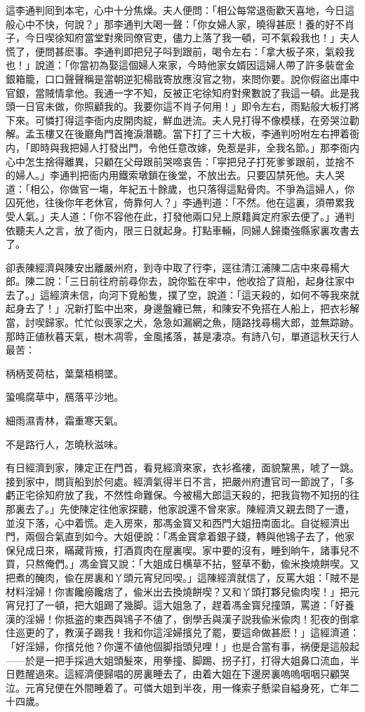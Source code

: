 這李通判囘到本宅，心中十分焦燥。夫人便問：「相公每常退衙歡天喜地，今日這般心中不快，何說？」那李通判大喝一聲：「你女婦人家，曉得甚麽！養的好不肖子，今日喫徐知府當堂對衆同僚官吏，儘力上落了我一頓，可不氣殺我也！」夫人慌了，便問甚麽事。李通判即把兒子呌到跟前，喝令左右：「拿大板子來，氣殺我也！」說道：「你當初為娶這個婦人來家，今時他家女婿因這婦人帶了許多裝奩金銀箱籠，口口聲聲稱是當朝逆犯楊戩寄放應沒官之物，來問你要。說你假盜出庫中官銀，當賊情拿他。我通一字不知，反被正宅徐知府對衆數說了我這一頓。此是我頭一日官未做，你照顧我的。我要你這不肖子何用！」即令左右，雨點般大板打將下來。可憐打得這李衙内皮開肉綻，鮮血迸流。夫人見打得不像模樣，在旁哭泣勸解。孟玉樓又在後廳角門首掩淚潛聽。當下打了三十大板，李通判吩咐左右押着衙内，「即時與我把婦人打發出門，令他任意改嫁，免惹是非，全我名節。」那李衙内心中怎生捨得離異，只顧在父母跟前哭啼哀告：「寜把兒子打死爹爹跟前，並捨不的婦人。」李通判把衙内用鐵索墩鎖在後堂，不放出去。只要囚禁死他。夫人哭道：「相公，你做官一塲，年紀五十餘歲，也只落得這點骨肉。不爭為這婦人，你囚死他，往後你年老休官，倚靠何人？」李通判道：「不然。他在這裏，須帶累我受人氣。」夫人道：「你不容他在此，打發他兩口兒上原籍眞定府家去便了。」通判依聽夫人之言，放了衙内，限三日就起身。打點車輛，同婦人歸棗強縣家裏攻書去了。

卻表陳經濟與陳安出離嚴州府，到寺中取了行李，逕往清江浦陳二店中來尋楊大郎。陳二說：「三日前往府前尋你去，說你監在牢中，他收拾了貨船，起身往家中去了。」這經濟未信，向河下覓船隻，撲了空，說道：「這天殺的，如何不等我來就起身去了！」况新打監中出來，身邊盤纏已無，和陳安不免搭在人船上，把衣衫解當，討喫歸家。忙忙似喪家之犬，急急如漏網之魚，隨路找尋楊大郎，並無踪跡。那時正値秋暮天氣，樹木凋零，金風搖落，甚是凄凉。有詩八句，單道這秋天行人最苦：

\begin{myquote}
柄柄芰荷枯，葉葉梧桐墜。

蛩鳴腐草中，鴈落平沙地。

細雨濕青林，霜重寒天氣。

不是路行人，怎曉秋滋味。
\end{myquote}

有日經濟到家，陳定正在門首，看見經濟來家，衣衫襤褸，面貌黧黑，唬了一跳。接到家中，問貨船到於何處。經濟氣得半日不言，把嚴州府遭官司一節說了，「多虧正宅徐知府放了我，不然性命難保。今被楊大郎這天殺的，把我貨物不知拐的往那裏去了。」先使陳定往他家探聽，他家說還不曾來家。陳經濟又親去問了一遭，並沒下落，心中着慌。走入房來，那馮金寳又和西門大姐扭南面北。自従經濟出門，兩個合氣直到如今。大姐便說：「馮金寳拿着銀子錢，轉與他鴇子去了，他家保兒成日來，瞞藏背掖，打酒買肉在屋裏喫。家中要的沒有，睡到晌午，諸事兒不買，只熬俺們。」馮金寳又說：「大姐成日横草不拈，竪草不動，偸米換燒餅喫。又把煮的醃肉，偸在房裏和丫頭元宵兒同喫。」這陳經濟就信了，反罵大姐：「賊不是材料淫婦！你害饞癆饞痞了，偸米出去換燒餅喫？又和丫頭打夥兒偸肉喫！」把元宵兒打了一頓，把大姐踢了幾脚。這大姐急了，趕着馮金寳兒撞頭，罵道：「好養漢的淫婦！你抵盗的東西與鴇子不値了，倒學舌與漢子説我偸米偸肉！犯夜的倒拿住巡更的了，教漢子踢我！我和你這淫婦擯兑了罷，要這命做甚麽！」這經濟道：「好淫婦，你擯兑他？你還不値他個脚指頭兒哩！」也是合當有事，祸便是這般起——於是一把手採過大姐頭髮來，用拳撞、脚踢、拐子打，打得大姐鼻口流血，半日甦醒過來。這經濟便歸唱的房裏睡去了，由着大姐在下邊房裏嗚嗚咽咽只顧哭泣。元宵兒便在外間睡着了。可憐大姐到半夜，用一條索子懸梁自縊身死，亡年二十四歲。

